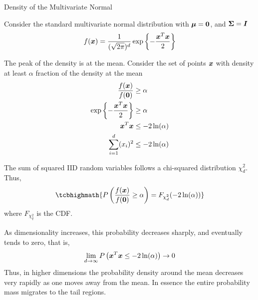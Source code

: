 \begin{frame}{Density of the Multivariate Normal}

  \small

Consider the standard multivariate normal distribution
with ${\bm \mu} = \mathbf{0}$, and ${\bm \Sigma} = {\boldsymbol I}$ 
\begin{align*}
f({\boldsymbol x}) = \frac{1}{(\sqrt{2\pi})^d}\exp\left\{-\frac{{\boldsymbol x}^T
{\boldsymbol x}}{2}\right\}
\end{align*}

\medskip
The peak of the density is at the mean. 
Consider the set of points ${\boldsymbol x}$ with density at least
$\alpha$ fraction of the density at the mean
\begin{align*}
\frac{f({\boldsymbol x})}{f(\mathbf{0})} & \ge \alpha\nonumber\\
\exp\left\{-\frac{{\boldsymbol x}^T{\boldsymbol x}}{2}\right\}  & \ge \alpha\nonumber\\
 {\boldsymbol x}^T{\boldsymbol x}  & \le -2 \ln (\alpha)\nonumber\\
  \sum_{i=1}^d (x_i)^2 & \le -2 \ln (\alpha)
\end{align*}

\medskip
The sum of squared IID random variables follows a chi-squared
distribution $\chi^2_d$. Thus,
\begin{align*}
\tcbhighmath{
P\lB(\frac{f(\bx)}{f(\bzero)} \geq \alpha\rB) 
=  F_{\chi^2_d}(-2\ln(\alpha))
}
\end{align*}
where $F_{\chi^2_q}$ is the CDF.

\medskip
As dimensionality increases, this probability
decreases sharply, and eventually tends to zero, that is,
\begin{equation*}
\lim_{d\to\infty}  P\left( {\boldsymbol x}^T{\boldsymbol x} \le -2\ln(\alpha) \right) \to 0
\end{equation*}
Thus, in higher dimensions the probability density around the
mean decreases very rapidly as one moves away from the mean. In
essence the entire probability mass migrates to the tail regions.
\end{frame}



\def\pshlabel#1{\scriptsize {$#1$}}
\def\psvlabel#1{\scriptsize {$#1$}}



